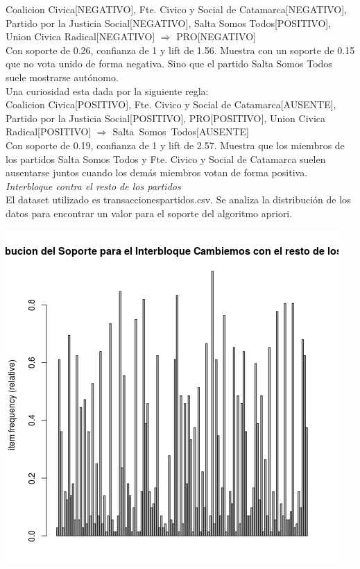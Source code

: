 \documentclass{endm}
\begin{document}
{Coalicion Civica[NEGATIVO],         
Fte. Civico y Social de Catamarca[NEGATIVO],
Partido por la Justicia Social[NEGATIVO],
Salta Somos Todos[POSITIVO],
Union Civica Radical[NEGATIVO]}  $\Longrightarrow$ {PRO[NEGATIVO]} \\

Con soporte de 0.26, confianza de 1 y lift de 1.56. Muestra  con un soporte de 0.15 que no vota unido de forma negativa. Sino que el partido Salta Somos Todos suele mostrarse autónomo. \\

Una curiosidad esta dada por la siguiente regla: \\

{Coalicion Civica[POSITIVO],                    
Fte. Civico y Social de Catamarca[AUSENTE], 
Partido por la Justicia Social[POSITIVO], 
PRO[POSITIVO], 
Union Civica Radical[POSITIVO]}             $\Longrightarrow$  {Salta\ Somos\ Todos[AUSENTE]} \\

Con soporte de 0.19, confianza de 1 y lift de 2.57. Muestra que los miembros de los partidos Salta Somos Todos y Fte. Civico y Social de Catamarca suelen ausentarse juntos cuando los demás miembros votan de forma positiva. \\


\textit{Interbloque contra el resto de los partidos} \\

El dataset utilizado es transaccionespartidos.csv. Se analiza la distribución de los datos para encontrar un valor para el soporte del algoritmo apriori. \\

\begin{center}
\includegraphics[scale=0.4]{graficos/soportesCambiemosRestoPartidos.png}
\end{center}
\end{document}
